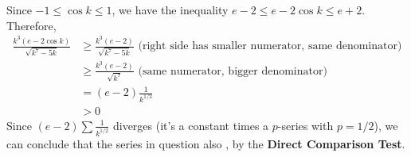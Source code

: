 \documentclass[main]{subfiles}
\begin{document}
\begin{enumerate}[resume]
\begin{enumerate}
\begin{solution}
  Since $-1 \leq \cos k \leq 1$, we have the inequality $e - 2 \leq e
  - 2 \cos k \leq e + 2$.  Therefore,
  \begin{align*}
  \frac{k^3 (e - 2 \cos k)}{\sqrt{k^7 - 5k}} & \geq \frac{k^3 (e -
  2)}{\sqrt{k^7 - 5k}} \textrm{ (right side has smaller numerator,
  same denominator)} \\
  & \geq \frac{k^3 (e - 2)}{\sqrt{k^7}} \textrm{ (same numerator,
  bigger denominator)} \\
  &= (e - 2) \frac{1}{k^{1/2}} \\
  & > 0 
  \end{align*}
  Since $\displaystyle (e - 2) \sum \frac{1}{k^{1/2}}$ diverges (it's
  a constant times a $p$-series with $p = 1/2$), we can conclude that
  the series in question also , by the \textbf{Direct
  Comparison Test}.
  \end{solution}

\end{enumerate}



\end{enumerate}
\end{document}
